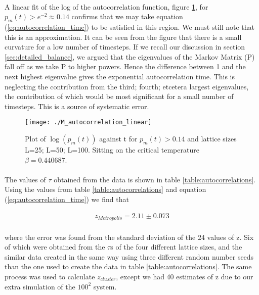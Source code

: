 \documentclass[12pt] {report} %
\begin{document}
			\paragraph{}
				A linear fit of the log of the autocorrelation function, figure \ref{fig:M_autocorrelation_linear}, for $p_m(t) > e^{-2} \approx 0.14$ confirms that we may take equation (\ref{eq:autocorrelation_time}) to be satisfied in this region. We must still note that this is an approximation. It can be seen from the figure that there is a small curvature for a low number of timesteps. If we recall our discussion in section \ref{sec:detailed_balance}, we argued that the eigenvalues of the Markov Matrix (P) fall off as we take P to higher powers. Hence the difference between 1 and the next highest eigenvalue gives the exponential autocorrelation time. This is neglecting the contribution from the third; fourth; etcetera largest eigenvalues, the contribution of which would be most significant for a small number of timesteps. This is a source of systematic error.
			
			\begin{figure}[h]
				\centering
				\texttt{[image: ./M\_autocorrelation\_linear]}
				\caption{Plot of $\log(p_m(t))$ against t for $p_m(t) > 0.14$ and lattice sizes L=25; L=50; L=100. Sitting on the critical temperature $\beta = 0.440687$.}
				\label{fig:M_autocorrelation_linear}
			\end{figure}	

			\paragraph{}
				The values of $\tau$ obtained from the data is shown in table \ref{table:autocorrelations}. Using the values from table \ref{table:autocorrelations} and equation (\ref{eq:autocorrelation_time}) we find that
				
			\begin{align}
				z_{Metropolis} = 2.11 \pm 0.073 \label{eq:z_result}
			\end{align} 
			
			\paragraph{}
				where the error was found from the standard deviation of the 24 values of z. Six of which were obtained from the $\tau$s of the four different lattice sizes, and the similar data created in the same way using three different random number seeds than the one used to create the data in table \ref{table:autocorrelations}. The same process was used to calculate $z_{cluster}$, except we had 40 estimates of z due to our extra simulation of the $100^2$ system.
			
\end{document}
